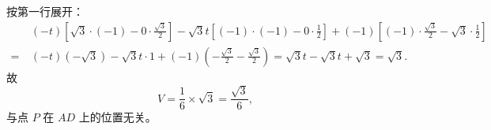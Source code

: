 \begin{answer}
按第一行展开：
\nopagebreak[4]
\[\begin{aligned}
&\ (-t)\left[\sqrt3\cdot(-1)-0\cdot\frac{\sqrt3}2\right]-\sqrt3t\left[(-1)\cdot(-1)-0\cdot\frac12\right]+(-1)\left[(-1)\cdot\frac{\sqrt3}2-\sqrt3\cdot\frac12\right]\\
=&\ (-t)(-\sqrt3)-\sqrt3t\cdot1+(-1)\left(-\frac{\sqrt3}2-\frac{\sqrt3}2\right)=\sqrt3t-\sqrt3t+\sqrt3=\sqrt3.
\end{aligned}\]
故
\nopagebreak[4]
\[V=\frac16\times\sqrt3=\frac{\sqrt3}6,\]
与点 $P$ 在 $AD$ 上的位置无关。



\end{answer}
